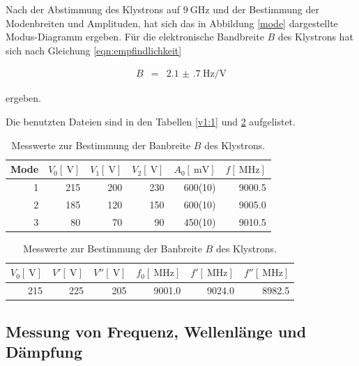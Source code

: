 Nach der Abstimmung des Klystrons auf $\SI{9}{\giga\hertz}$ und der Bestimmung der Modenbreiten und Amplituden, hat sich das in Abbildung \ref{mode} dargestellte Modus-Diagramm ergeben.
Für die elektronische Bandbreite $B$ des Klystrons hat sich nach Gleichung \eqref{eqn:empfindlichkeit}

\begin{eqnarray}
	B &=& \SI{2.1(7)}{\hertz\per\volt}
\end{eqnarray}

ergeben.

Die benutzten Dateien sind in den Tabellen \ref{v1:1} und \ref{v1:2} aufgelistet.

\begin{table}
\centering
\begin{tabular}{r r r r r r}
	Mode & $V_\text{0}[\SI{}{\volt}]$ & $V_\text{1}[\SI{}{\volt}]$ & $V_\text{2}[\SI{}{\volt}]$ & $A_\text{0}[\SI{}{\milli\volt}]$ & $f[\SI{}{\mega\hertz}]$ \\
	\hline
	\hline
	1 & 215 & 200 & 230 & {600(10)} & 9000.5\\
	2 & 185 & 120 & 150 & {600(10)} & 9005.0\\
	3 &  80 &  70 &  90 & {450(10)} & 9010.5\\
	\hline
\end{tabular}
\caption{Messwerte zur Darstellung des Modus-Diagramms.}
\label{v1:1}
\begin{tabular}{r r r r r r}
	$V_\text{0}[\SI{}{\volt}]$ & $V'[\SI{}{\volt}]$ & $V''[\SI{}{\volt}]$ & $f_\text{0}[\SI{}{\mega\hertz}]$  & $f'[\SI{}{\mega\hertz}]$ & $f''[\SI{}{\mega\hertz}]$ \\
	\hline
	\hline
	215 & 225 & 205 & 9001.0 & 9024.0 & 8982.5\\
	\hline
\end{tabular}
\caption{Messwerte zur Bestimmung der Banbreite $B$ des Klystrons.}
\label{v1:2}
\end{table}

\FloatBarrier

\subsection{Messung von Frequenz, Wellenlänge und Dämpfung} %
\label{sub:messung_von_frequenz_wellenlaenge_und_daempfung}

